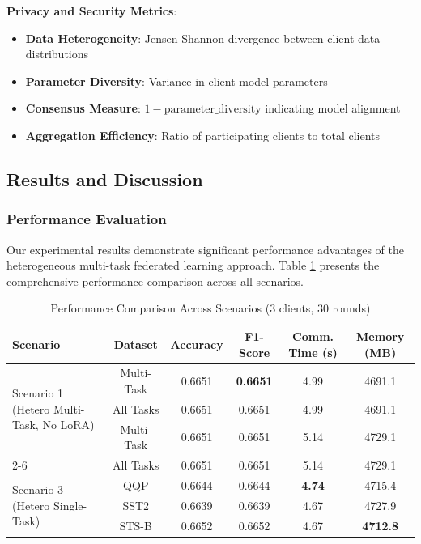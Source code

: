 \textbf{Privacy and Security Metrics}:
\begin{itemize}
    \item \textbf{Data Heterogeneity}: Jensen-Shannon divergence between client data distributions
    \item \textbf{Parameter Diversity}: Variance in client model parameters
    \item \textbf{Consensus Measure}: $1 - \text{parameter\_diversity}$ indicating model alignment
    \item \textbf{Aggregation Efficiency}: Ratio of participating clients to total clients
\end{itemize}

\subsection{Results and Discussion}

\subsubsection{Performance Evaluation}
Our experimental results demonstrate significant performance advantages of the heterogeneous multi-task federated learning approach. Table \ref{tab:performance_comparison} presents the comprehensive performance comparison across all scenarios.

\begin{table}[h]
\centering
\caption{Performance Comparison Across Scenarios (3 clients, 30 rounds)}
\label{tab:performance_comparison}
\begin{tabular}{|l|c|c|c|c|c|}
\hline
\textbf{Scenario} & \textbf{Dataset} & \textbf{Accuracy} & \textbf{F1-Score} & \textbf{Comm. Time (s)} & \textbf{Memory (MB)} \\
\hline
\multirow{3}{*}{Scenario 1 (Hetero Multi-Task, No LoRA)} & Multi-Task & 0.6651 & \textbf{0.6651} & 4.99 & 4691.1 \\
\cline{2-6}
& All Tasks & 0.6651 & 0.6651 & 4.99 & 4691.1 \\
\hline
\multirow{3}{*}{Scenario 2 (Hetero Multi-Task, LoRA)} & Multi-Task & 0.6651 & 0.6651 & 5.14 & 4729.1 \\
\cline{2-6}
& All Tasks & 0.6651 & 0.6651 & 5.14 & 4729.1 \\
\hline
\multirow{3}{*}{Scenario 3 (Hetero Single-Task)} & QQP & 0.6644 & 0.6644 & \textbf{4.74} & 4715.4 \\
& SST2 & 0.6639 & 0.6639 & 4.67 & 4727.9 \\
& STS-B & 0.6652 & 0.6652 & 4.67 & \textbf{4712.8} \\
\hline
\end{tabular}
\end{table}


